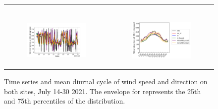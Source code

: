 \begin{figure}[hbtp]
\begin{tabular}{cc}
\begin{subfigure}[t]{0.5\textwidth}
        \end{subfigure} \\
        \begin{subfigure}[t]{0.5\textwidth}
            \caption{}
            \includegraphics[width=\textwidth]{images/chap5/SOP_TS_DC/time_series_elsplans_wind_direction_10m.png}
        \end{subfigure} &
        \begin{subfigure}[t]{0.5\textwidth}
            \caption{}
            \includegraphics[width=\textwidth]{images/chap5/SOP_TS_DC/diurnal_cycle_elsplans_wind_direction_10m.png}
        \end{subfigure}
    \end{tabular}
    \caption{Time series and mean diurnal cycle of wind speed and direction on both sites, July 14-30 2021. The envelope for \mesomean represents the 25th and 75th percentiles of the distribution.}
    \label{fig:bothsites_wind}
\end{figure}

\hfill

